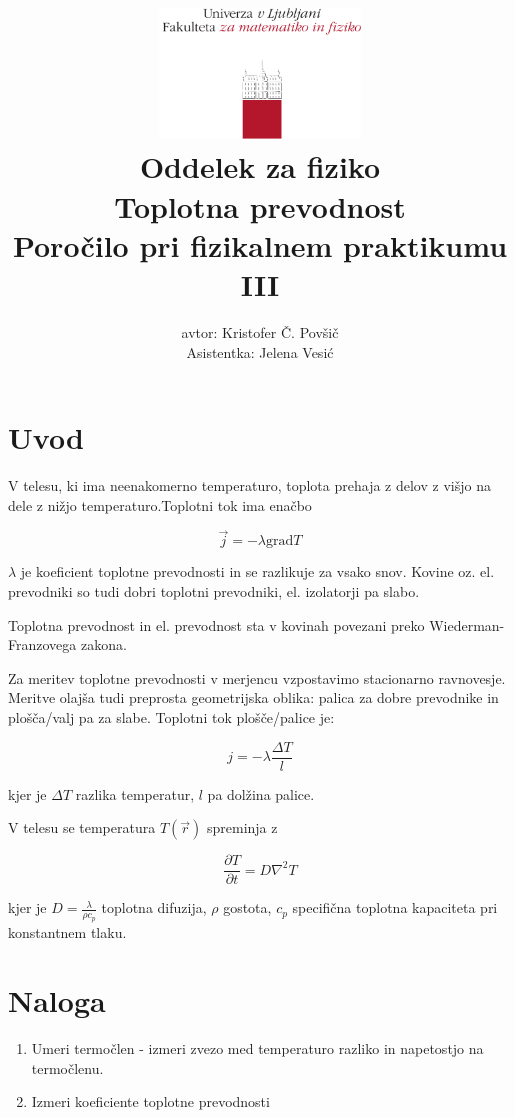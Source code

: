 \documentclass[12pt]{report}
\title{
  \includegraphics[width=0.4\textwidth]{fmf_logo}\\
  {\small Oddelek za fiziko} \\
  {Toplotna prevodnost}\\
  {\small Poročilo pri fizikalnem praktikumu III}\\

}
\date{}
\author{ avtor: Kristofer Č. Povšič \\[5 cm]
 \small  Asistentka: Jelena Vesić
}
\begin{document}
\setcounter{page}{2}

\maketitle

\chapter*{Uvod}

V telesu, ki ima neenakomerno temperaturo, toplota prehaja z delov z višjo na dele z nižjo temperaturo.Toplotni tok ima enačbo

\begin{equation}
  \vec{j}= - \lambda \text{grad}T
\end{equation}

$\lambda$ je koeficient toplotne prevodnosti in se razlikuje za vsako snov. Kovine oz. el. prevodniki so tudi dobri toplotni prevodniki, el. izolatorji pa slabo. 

Toplotna prevodnost in el. prevodnost sta v kovinah povezani preko Wiederman-Franzovega zakona. 

Za meritev toplotne prevodnosti v merjencu vzpostavimo stacionarno ravnovesje. Meritve olajša tudi preprosta geometrijska oblika: palica za dobre prevodnike in plošča/valj pa za slabe. Toplotni tok plošče/palice je: 

\begin{equation}
  j = - \lambda \frac{\Delta T}{l}
\end{equation}

kjer je $\Delta T$ razlika temperatur, $l$ pa dolžina palice. 

V telesu se temperatura $T(\vec{r})$ spreminja z

\begin{equation}
  \frac{\partial T}{\partial t} = D \nabla^2T
\end{equation}

kjer je $D = \frac{\lambda}{\rho c_p}$  toplotna difuzija, $\rho$ gostota, $c_p$ specifična toplotna kapaciteta pri konstantnem tlaku. 

\chapter*{Naloga}

\begin{enumerate}
  \item Umeri termočlen - izmeri zvezo med temperaturo razliko in napetostjo na termočlenu. 
  \item Izmeri koeficiente toplotne prevodnosti 
\end{enumerate}
\end{document}
